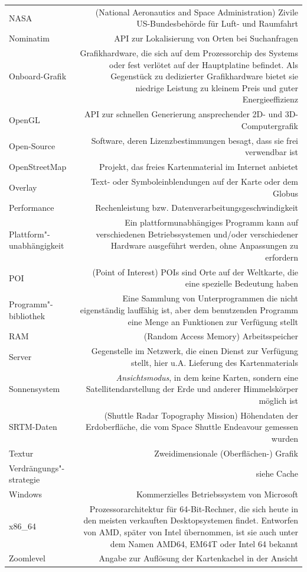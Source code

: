 \documentclass[10pt]{scrreprt}
\newcommand{\textref}[1]{\mbox{\raisebox{0.1ex}{\small$\rightarrow$ }\textit{#1}}}
\begin{document}
\begin{longtabu}{L{0.35} R{1.65}}
NASA  & (National Aeronautics and Space Administration) Zivile US-Bundesbehörde für Luft- und Raumfahrt\\
Nominatim  & API zur Lokalisierung von Orten bei Suchanfragen\\
Onboard-Grafik & Grafikhardware, die sich auf dem Prozessorchip des Systems oder fest verlötet auf der Hauptplatine befindet. Als Gegenstück zu dedizierter Grafikhardware bietet sie niedrige Leistung zu kleinem Preis und guter Energieeffizienz\\
OpenGL  & API zur schnellen Generierung ansprechender 2D- und 3D-Computergrafik\\
Open-Source & Software, deren Lizenzbestimmungen besagt, dass sie frei verwendbar ist\\
OpenStreetMap  & Projekt, das freies Kartenmaterial im Internet anbietet\\
Overlay  & Text- oder Symboleinblendungen auf der Karte oder dem Globus\\
Performance & Rechenleistung bzw. Datenverarbeitungsgeschwindigkeit\\
Plattform"-unabhängigkeit & Ein plattformunabhängiges Programm kann auf verschiedenen Betriebssystemen und/oder verschiedener Hardware ausgeführt werden, ohne Anpassungen zu erfordern\\
POI  & (Point of Interest) POIs sind Orte auf der Weltkarte, die eine spezielle Bedeutung haben\\
Programm"-bibliothek & Eine Sammlung von Unterprogrammen die nicht eigenständig lauffähig ist, aber dem benutzenden Programm eine Menge an Funktionen zur Verfügung stellt\\
RAM & (Random Access Memory) Arbeitsspeicher\\
Server & Gegenstelle im Netzwerk, die einen Dienst zur Verfügung stellt, hier u.A. Lieferung des Kartenmaterials\\
Sonnensystem & \textref{Ansichtsmodus}, in dem keine Karten, sondern eine Satellitendarstellung der Erde und anderer Himmelskörper möglich ist\\
SRTM-Daten & (Shuttle Radar Topography Mission) Höhendaten der Erdoberfläche, die vom Space Shuttle Endeavour gemessen wurden\\
Textur & Zweidimensionale (Oberflächen-) Grafik\\
Verdrängungs"-strategie  & siehe Cache\\
Windows & Kommerzielles Betriebssystem von Microsoft\\
x86\_64 & Prozessorarchitektur für 64-Bit-Rechner, die sich heute in den meisten verkauften Desktopsystemen findet. Entworfen von AMD, später von Intel übernommen, ist sie auch unter dem Namen AMD64, EM64T oder Intel 64 bekannt\\
Zoomlevel  & Angabe zur Auflösung der Kartenkachel in der Ansicht\\
\end{longtabu}


\cleardoublepage
{}
\printindex
\end{document}
